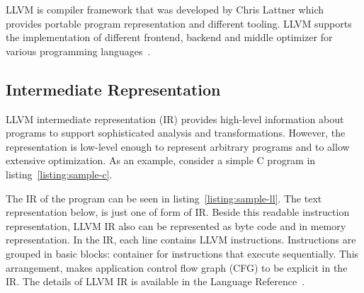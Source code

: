 LLVM is compiler framework that was developed by Chris Lattner which provides
portable program representation and different tooling. LLVM supports the
implementation of different frontend, backend and middle optimizer for various
programming languages~\cite{lattnerLLVMCompilationFramework2004a}. 

\subsection{Intermediate Representation}

LLVM intermediate representation (IR) provides high-level information about
programs to support sophisticated analysis and transformations. However, the
representation is low-level enough to represent arbitrary programs and to allow
extensive optimization. As an example, consider a simple C program in
listing~\ref{listing:sample-c}.


The IR of the program can be seen in listing~\ref{listing:sample-ll}. The text
representation below, is just one of form of IR. Beside this readable
instruction representation, LLVM IR also can be represented as byte code and in
memory representation. In the IR, each line contains LLVM instructions.
Instructions are grouped in basic blocks: container for instructions that
execute sequentially. This arrangement, makes application control flow graph
(CFG) to be explicit in the IR. The details of LLVM IR is available in the
Language Reference~\cite{LLVMLanguageReferencea}.



